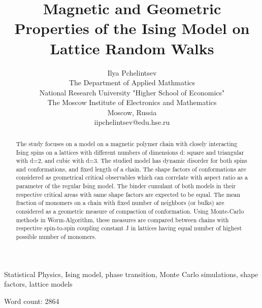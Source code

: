 \documentclass[conference]{IEEEtran}
\title{Magnetic and Geometric Properties of the Ising Model on Lattice Random Walks}
\author{Ilya Pchelintsev\\
The Department of Applied Mathmatics\\
National Research University "Higher School of Economics"\\
The Moscow Institute of Electronics and Mathematics\\
Moscow, Russia\\
iipchelintsev@edu.hse.ru}
\begin{document}
\maketitle



\begin{abstract}
The study focuses on a model on a magnetic polymer chain with closely interacting Ising spins on a lattices with different numbers of dimensions d: square and triangular with d=2, and cubic with d=3. 
The studied model has dynamic disorder for both spins and conformations, and fixed length of a chain. 
The shape factors of conformations are considered as geometrical critical observables which can correlate with aspect ratio as a parameter of the regular Ising model.
The binder cumulant of both models in their respective critical areas with same shape factors are expected to be equal. 
The mean fraction of monomers on a chain with fixed number of neighbors (or bulks) are considered as a geometric measure of compaction of conformation.
Using Monte-Carlo methods in Worm-Algorithm, these measures are compared between chains with respective spin-to-spin coupling constant J in lattices having equal number of highest possible number of monomers. 
\end{abstract}

\begin{IEEEkeywords}
Statistical Physics, Ising model, phase transition, Monte Carlo simulations, shape factors, lattice models
\end{IEEEkeywords}











\null \hfill Word count: 2864

\end{document}
